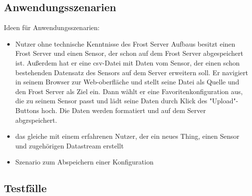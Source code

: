 \documentclass[12 pt]{article}
\begin{document}
\subsection{Anwendungsszenarien}
Ideen für Anwendungsszenarien:
\begin{itemize}
\item Nutzer ohne technische Kenntnisse des Frost Server Aufbaus besitzt einen Frost Server und einen Sensor, der schon auf dem Frost Server abgespeichert ist. Außerdem hat er eine csv-Datei mit Daten vom Sensor, der einen schon bestehenden Datensatz des Sensors auf dem Server erweitern soll. Er navigiert in seinem Browser zur Web-oberfläche und stellt seine Datei als Quelle und den Frost Server als Ziel ein. Dann wählt er eine Favoritenkonfiguration aus, die zu seinem Sensor passt und lädt seine Daten durch Klick des "Upload"-Buttons hoch. Die Daten werden formatiert und auf dem Server abgrspeichert.
\item das gleiche mit einem erfahrenen Nutzer, der ein neues Thing, einen Sensor und zugehörigen Datastream erstellt
\item Szenario zum Abspeichern einer Konfiguration
\end{itemize}


\subsection{Testfälle}
\end{document}
